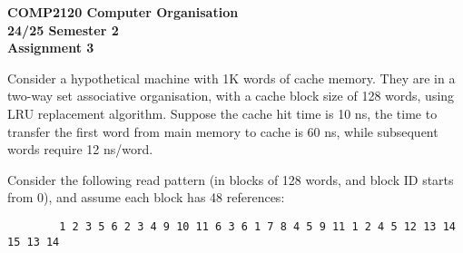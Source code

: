 \documentclass[answers]{exam}
\begin{document}
\begin{center}
    \textbf
    {\Large{COMP2120 Computer Organisation} \\
    \large{24/25 Semester 2} \\
    \large{Assignment 3}}
\end{center}

\begin{questions}

    \question Consider a hypothetical machine with 1K words of cache memory. They are in a two-way set
    associative organisation, with a cache block size of 128 words, using LRU replacement algorithm.
    Suppose the cache hit time is 10 ns, the time to transfer the first word from main memory to cache
    is 60 ns, while subsequent words require 12 ns/word.
    \label{question-2way-set-cache}

    Consider the following read pattern (in blocks of 128 words, and block ID starts from 0),
    and assume each block has 48 references:

    \begin{verbatim}
        1 2 3 5 6 2 3 4 9 10 11 6 3 6 1 7 8 4 5 9 11 1 2 4 5 12 13 14 15 13 14
    \end{verbatim}

\end{questions}
\end{document}
